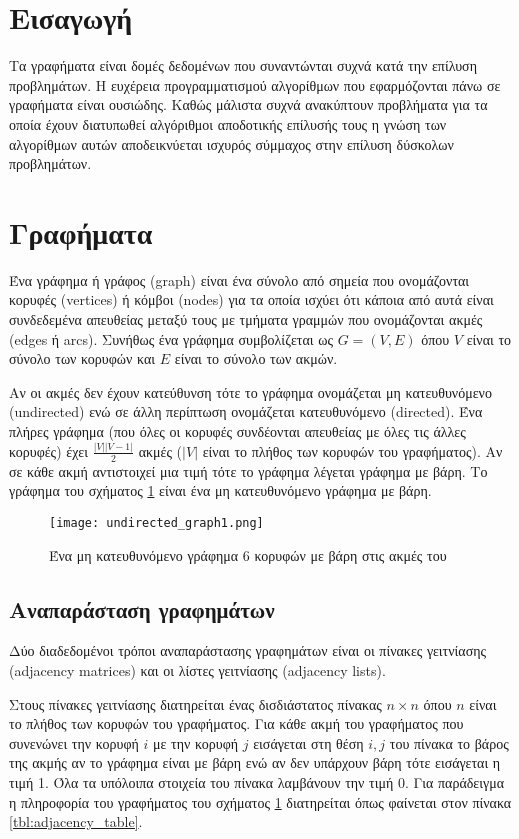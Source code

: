 \section{Εισαγωγή}
Τα γραφήματα είναι δομές δεδομένων που συναντώνται συχνά κατά την επίλυση προβλημάτων. Η ευχέρεια προγραμματισμού αλγορίθμων που εφαρμόζονται πάνω σε γραφήματα είναι ουσιώδης. Καθώς μάλιστα συχνά ανακύπτουν προβλήματα για τα οποία έχουν διατυπωθεί αλγόριθμοι αποδοτικής επίλυσής τους η γνώση των αλγορίθμων αυτών αποδεικνύεται ισχυρός σύμμαχος στην επίλυση δύσκολων προβλημάτων. 

\section{Γραφήματα}
Ένα γράφημα ή γράφος (graph) είναι ένα σύνολο από σημεία που ονομάζονται κορυφές (vertices) ή κόμβοι (nodes) για τα οποία ισχύει ότι κάποια από αυτά είναι συνδεδεμένα απευθείας μεταξύ τους με τμήματα γραμμών που ονομάζονται ακμές (edges ή arcs). Συνήθως ένα γράφημα συμβολίζεται ως $G=(V,E)$ όπου $V$ είναι το σύνολο των κορυφών και $E$ είναι το σύνολο των ακμών.

Αν οι ακμές δεν έχουν κατεύθυνση τότε το γράφημα ονομάζεται μη κατευθυνόμενο (undirected) ενώ σε άλλη περίπτωση ονομάζεται κατευθυνόμενο (directed). Ένα πλήρες γράφημα (που όλες οι κορυφές συνδέονται απευθείας με όλες τις άλλες κορυφές) έχει $\frac{|V||V-1|}{2}$ ακμές ($|V|$ είναι το πλήθος των κορυφών του γραφήματος). Αν σε κάθε ακμή αντιστοιχεί μια τιμή τότε το γράφημα λέγεται γράφημα με βάρη. Το γράφημα του σχήματος \ref{fig:undirected_graph1} είναι ένα μη κατευθυνόμενο γράφημα με βάρη.

\begin{figure}[ht]
	\centering
	\texttt{[image: undirected\_graph1.png]}
	\caption{Ένα μη κατευθυνόμενο γράφημα 6 κορυφών με βάρη στις ακμές του}
	\label{fig:undirected_graph1}
\end{figure}

\subsection{Αναπαράσταση γραφημάτων}
Δύο διαδεδομένοι τρόποι αναπαράστασης γραφημάτων είναι οι πίνακες γειτνίασης (adjacency matrices) και οι λίστες γειτνίασης (adjacency lists).

Στους πίνακες γειτνίασης διατηρείται ένας δισδιάστατος πίνακας $n \times n$ όπου $n$ είναι το πλήθος των κορυφών του γραφήματος. Για κάθε ακμή του γραφήματος που συνενώνει την κορυφή $i$ με την κορυφή $j$ εισάγεται στη θέση $i,j$ του πίνακα το βάρος της ακμής αν το γράφημα είναι με βάρη ενώ αν δεν υπάρχουν βάρη τότε εισάγεται η τιμή 1. Όλα τα υπόλοιπα στοιχεία του πίνακα λαμβάνουν την τιμή 0. Για παράδειγμα η πληροφορία του γραφήματος του σχήματος \ref{fig:undirected_graph1} διατηρείται όπως φαίνεται στον πίνακα \ref{tbl:adjacency_table}.


